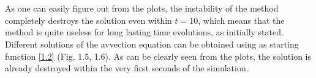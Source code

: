 \documentclass[11pt,a4paper]{article}
\begin{document}
\begin{figure}[!h]
\end{figure} \ \\ \\
As one can easily figure out from the plots, the instability of the method completely destroys the solution even within $t=10$, which means that the method is quite useless for long lasting time evolutions, as initially stated. Different solutions of the avvection equation can be obtained using as starting function \eqref{1.2} (Fig. 1.5, 1.6). As can be clearly seen from the  plots, the solution is already destroyed within the very first seconds of the simulation. 
\end{document}
